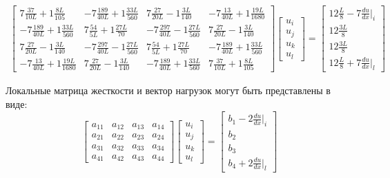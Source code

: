 \begin{align}\label{cub}
\begin{bmatrix}
    7 \frac{37}{10L}    +1 \frac{8L}{105}   &   -7  \frac{189}{40L}   +1 \frac{33L}{560}   & 7 \frac{27}{20L}   -1 \frac{3L}{140}   &   -7  \frac{13}{40L}    +1 \frac{19L}{1680}   \\
	  -7  \frac{189}{40L}    +1 \frac{33L}{560}   & 7 \frac{54}{5L}  +1 \frac{27L}{70}  &   -7  \frac{297}{40L}   -1 \frac{27L}{560}   & 7 \frac{27}{20L}    -1 \frac{3L}{140}   \\
	7 \frac{27}{20L}     -1 \frac{3L}{140}   &   -7  \frac{297}{40L}   -1 \frac{27L}{560}   & 7 \frac{54}{5L}  +1 \frac{27L}{70}   &   -7  \frac{189}{40L}    +1 \frac{33L}{560}   \\
	  -7  \frac{13}{40L}    +1 \frac{19L}{1680}   & 7 \frac{27}{20L}   -1 \frac{3L}{140}   &   -7  \frac{189}{40L}   +1 \frac{33L}{560}   & 7 \frac{37}{10L}    +1 \frac{8L}{105}  
\end{bmatrix}
\begin{bmatrix}
	u_i \\
	u_j \\
	u_k\\
	u_l
\end{bmatrix}
=
\begin{bmatrix}
    12\frac{L}{8}   -7  \frac{du}{dx}|_i \\
	12\frac{3L}{8}\\
	12\frac{3L}{8}\\
	12\frac{L}{8}   +7  \frac{du}{dx}|_l
\end{bmatrix}
\end{align}

Локальные матрица жесткости и вектор нагрузок могут быть представлены в виде:
$$ \begin{bmatrix}
a_{11}     &  a_{12}  &  a_{13} &  a_{14}\\
a_{21}     &  a_{22}  &  a_{23} &  a_{24}\\
a_{31}     &  a_{32}  &  a_{33} &  a_{34}\\
a_{41}     &  a_{42}  & a_{43}  &  a_{44}
\end{bmatrix}
\begin{bmatrix}
u_i \\
u_j \\
u_k\\
u_l
\end{bmatrix} =
\begin{bmatrix}
b_1 - 2 \frac{du}{dx}|_i \\
b_2\\
b_3\\
b_4 + 2 \frac{du}{dx}|_l
\end{bmatrix}$$

